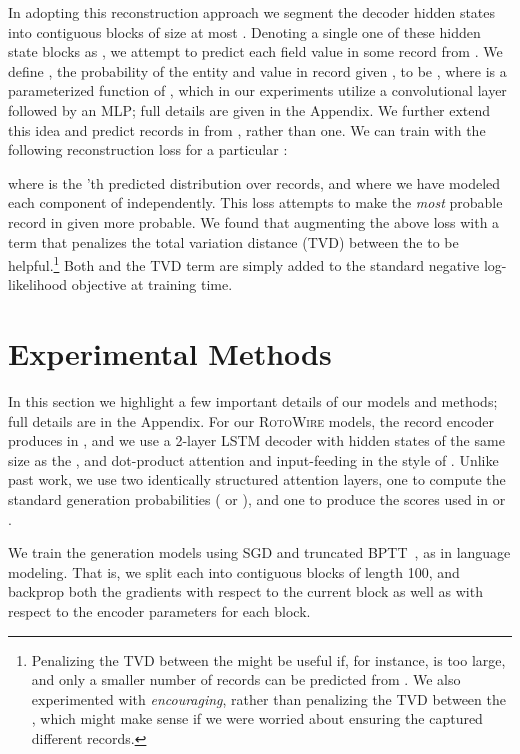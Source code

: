 \documentclass[11pt,letterpaper]{article}
\begin{document}
In adopting this reconstruction approach we 
segment the decoder hidden states  into
 contiguous blocks of size at most
. Denoting a single one of these hidden state blocks as ,
we attempt to predict each field value in some record
 from . We define
, the probability of the entity and value in record  given , to be
, where  is a parameterized function of
, which in our experiments utilize a convolutional layer
followed by an MLP; full details are given in the Appendix. We further extend this
idea and predict  records in  from ,
rather than one. We can train with the following reconstruction loss for a particular :

where  is the 'th predicted distribution over records, and where we have modeled each component of  independently. This loss attempts to make the \textit{most} probable record in  given  more probable. We found that augmenting the above loss with a term that penalizes the total variation distance (TVD) between the  to be helpful.\footnote{Penalizing the TVD between the  might be useful if, for instance,  is too large, and only a smaller number of records can be predicted from . We also experimented with \textit{encouraging}, rather than penalizing the TVD between the , which might make sense if we were worried about ensuring the  captured different records. 
} Both  and the TVD term are simply added to the standard negative log-likelihood objective at training time.


\section{Experimental Methods}

In this section we highlight a few important details of our models and methods; full details are in the Appendix. For our \textsc{RotoWire} models, the record encoder produces  in , and we use a 2-layer LSTM
decoder with hidden states of the same size as the ,
and dot-product attention and input-feeding in the style of
\citet{luong2015effective}. Unlike past work, we use two identically structured
attention layers, one to compute the standard generation probabilities ( or ), and one to produce the scores used in 
 or . 

We train the generation models using SGD and
truncated BPTT~\cite{elman1990,mikolov-2010}, as in language
modeling. That is, we split each  into contiguous blocks of length 100, and backprop both the gradients with respect to the current block as well as with respect to the encoder parameters for each block.
\end{document}
